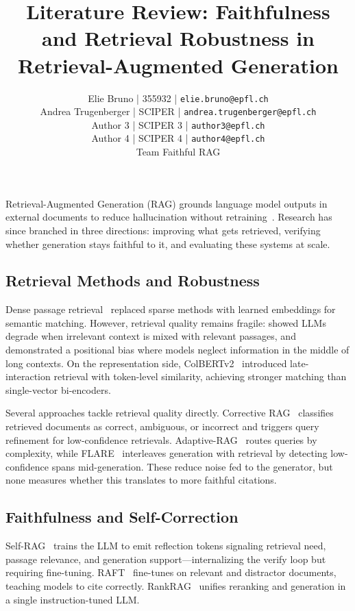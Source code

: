 \documentclass[11pt]{article}
\title{Literature Review: Faithfulness and Retrieval Robustness in Retrieval-Augmented Generation}
\author{\normalfont
Elie Bruno | 355932 | \texttt{elie.bruno@epfl.ch} \\
Andrea Trugenberger | SCIPER | \texttt{andrea.trugenberger@epfl.ch} \\
Author 3 | SCIPER 3 | \texttt{author3@epfl.ch} \\
Author 4 | SCIPER 4 | \texttt{author4@epfl.ch} \\
Team Faithful RAG \\
}
\begin{document}
\maketitle
\thispagestyle{fancy}

Retrieval-Augmented Generation (RAG) grounds language model outputs in external documents to reduce hallucination without retraining~\cite{retrievalaugmentedgeneration}. Research has since branched in three directions: improving what gets retrieved, verifying whether generation stays faithful to it, and evaluating these systems at scale.

\subsection{Retrieval Methods and Robustness}

Dense passage retrieval~\cite{karpukhin-etal-2020-dense} replaced sparse methods with learned embeddings for semantic matching. However, retrieval quality remains fragile: \citet{shi2023large} showed LLMs degrade when irrelevant context is mixed with relevant passages, and \citet{liu2024lost} demonstrated a positional bias where models neglect information in the middle of long contexts. On the representation side, ColBERTv2~\cite{santhanam2022colbertv2} introduced late-interaction retrieval with token-level similarity, achieving stronger matching than single-vector bi-encoders.

Several approaches tackle retrieval quality directly. Corrective RAG~\cite{yan2024corrective} classifies retrieved documents as correct, ambiguous, or incorrect and triggers query refinement for low-confidence retrievals. Adaptive-RAG~\cite{jeong2024adaptiverag} routes queries by complexity, while FLARE~\cite{jiang2023active} interleaves generation with retrieval by detecting low-confidence spans mid-generation. These reduce noise fed to the generator, but none measures whether this translates to more faithful citations.

\subsection{Faithfulness and Self-Correction}

Self-RAG~\cite{asai2024selfrag} trains the LLM to emit reflection tokens signaling retrieval need, passage relevance, and generation support---internalizing the verify loop but requiring fine-tuning. RAFT~\cite{zhang2024raft} fine-tunes on relevant and distractor documents, teaching models to cite correctly. RankRAG~\cite{yu2024rankrag} unifies reranking and generation in a single instruction-tuned LLM.
\end{document}
